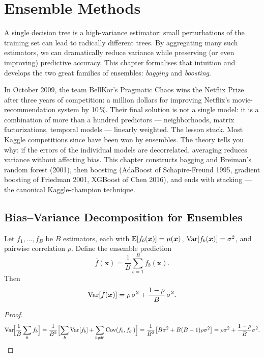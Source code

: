 \chapter{Ensemble Methods}
\label{ch:ensembles}

\begin{intuition}[title=\textbf{Why Combine Models?}]
A single decision tree is a high-variance estimator: small perturbations of the training set can lead to radically different trees. By aggregating many such estimators, we can dramatically reduce variance while preserving (or even improving) predictive accuracy. This chapter formalises that intuition and develops the two great families of ensembles: \emph{bagging} and \emph{boosting}.
\end{intuition}

In October 2009, the team BellKor's Pragmatic Chaos wins the Netflix Prize after three years of competition: a million dollars for improving Netflix's movie-recommendation system by 10\,\%. Their final solution is not a single model: it is a combination of more than a hundred predictors --- neighborhoods, matrix factorizations, temporal models --- linearly weighted. The lesson stuck. Most Kaggle competitions since have been won by ensembles. The theory tells you why: if the errors of the individual models are decorrelated, averaging reduces variance without affecting bias. This chapter constructs bagging and Breiman's random forest (2001), then boosting (AdaBoost of Schapire-Freund 1995, gradient boosting of Friedman 2001, XGBoost of Chen 2016), and ends with stacking --- the canonical Kaggle-champion technique.

\section{Bias--Variance Decomposition for Ensembles}

\begin{theorem}
Let $f_1,\dots,f_B$ be $B$ estimators, each with $\mathbb{E}[f_b(\bm{x})]=\mu(\bm{x})$, $\mathrm{Var}[f_b(\bm{x})]=\sigma^2$, and pairwise correlation $\rho$. Define the ensemble prediction
\[
  \bar{f}(\bm{x}) = \frac{1}{B}\sum_{b=1}^{B} f_b(\bm{x}).
\]
Then
\[
  \mathrm{Var}[\bar{f}(\bm{x})] = \rho\,\sigma^2 + \frac{1-\rho}{B}\,\sigma^2.
\]
\end{theorem}

\begin{proof}
\[
  \mathrm{Var}\!\Bigl[\frac{1}{B}\sum_b f_b\Bigr]
  = \frac{1}{B^2}\Bigl[\sum_b \mathrm{Var}[f_b] + \sum_{b\neq b'}\mathrm{Cov}(f_b,f_{b'})\Bigr]
  = \frac{1}{B^2}\bigl[B\sigma^2 + B(B-1)\rho\sigma^2\bigr]
  = \rho\sigma^2 + \frac{1-\rho}{B}\sigma^2. \qedhere
\]
\end{proof}

